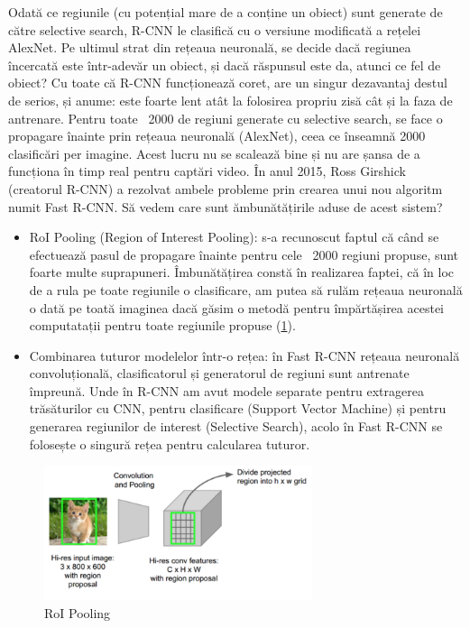 Odată ce regiunile (cu potențial mare de a conține un obiect) sunt generate de către selective search, R-CNN le clasifică cu o versiune modificată a rețelei AlexNet. Pe ultimul strat din rețeaua neuronală, se decide dacă regiunea încercată este într-adevăr un obiect, și dacă răspunsul este da, atunci ce fel de obiect?\newline
Cu toate că R-CNN funcționează coret, are un singur dezavantaj destul de serios, și anume: este foarte lent atât la folosirea propriu zisă cât și la faza de antrenare. Pentru toate ~2000 de regiuni generate cu selective search, se face o propagare înainte prin rețeaua neuronală (AlexNet), ceea ce înseamnă 2000 clasificări per imagine. Acest lucru nu se scalează bine și nu are șansa de a funcționa în timp real pentru captări video.\newline
În anul 2015, Ross Girshick (creatorul R-CNN) a rezolvat ambele probleme prin crearea unui nou algoritm numit Fast R-CNN. Să vedem care sunt ămbunătățirile aduse de acest sistem?
\begin{itemize}
	\item RoI Pooling (Region of Interest Pooling): s-a recunoscut faptul că când se efectuează pasul de propagare înainte pentru cele ~2000 regiuni propuse, sunt foarte multe suprapuneri. Îmbunătățirea constă în realizarea faptei, că în loc de a rula pe toate regiunile o clasificare, am putea să rulăm rețeaua neuronală o dată pe toată imaginea dacă găsim o metodă pentru împărtășirea acestei computatații pentru toate regiunile propuse (\ref{fig:roi_pooling}).
	\item Combinarea tuturor modelelor într-o rețea: în Fast R-CNN rețeaua neuronală convoluțională, clasificatorul și generatorul de regiuni sunt antrenate împreună. Unde în R-CNN am avut modele separate pentru extragerea trăsăturilor cu CNN, pentru clasificare (Support Vector Machine) și pentru generarea regiunilor de interest (Selective Search), acolo în Fast R-CNN se folosește o singură rețea pentru calcularea tuturor.
\end{itemize}
\begin{figure}[h!]
    	\centering
	\captionsetup{justification=centering, margin=2cm}
	\includegraphics[width=0.7\textwidth]{figures/fast_rcnn.png}
	\caption{RoI Pooling \cite{historyCNN}}
	\label{fig:roi_pooling}
\end{figure}




